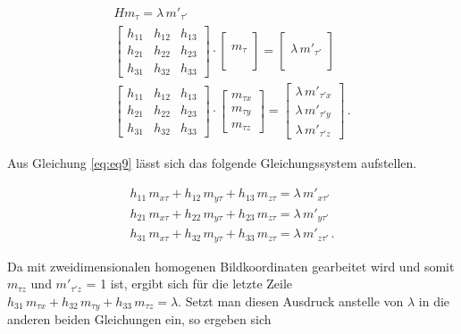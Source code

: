 \begin{gather}
	 H m_\tau = \lambda \,m'_{\tau'}\\
	\begin{bmatrix}
		h_{11}&h_{12}&h_{13}\\
		h_{21}&h_{22}&h_{23}\\
		h_{31}&h_{32}&h_{33}
	\end{bmatrix}
	\cdot
	\begin{bmatrix}
		\\m_\tau\\\\
	\end{bmatrix}
	=
	\begin{bmatrix}
		\\\lambda\, m'_{\tau'}\\\\
	\end{bmatrix}\\
	\begin{bmatrix}
		h_{11}&h_{12}&h_{13}\\
		h_{21}&h_{22}&h_{23}\\
		h_{31}&h_{32}&h_{33}
	\end{bmatrix}
	\cdot
	\begin{bmatrix}
		m_{\tau x}\\m_{\tau y}\\m_{\tau z}
	\end{bmatrix}
	=
	\begin{bmatrix}
		\lambda\, m'_{\tau' x}\\\lambda\, m'_{\tau' y}\\\lambda \,m'_{\tau' z}\label{eq:eq9}
	\end{bmatrix} \, .
\end{gather}

Aus Gleichung \ref{eq:eq9} lässt sich das folgende Gleichungssystem aufstellen.  

\begin{gather}
	h_{11}\,m_{x \tau}+h_{12}\,m_{y \tau}+h_{13}\,m_{z \tau}= \lambda \,m'_{x\tau'}\\
	h_{21}\,m_{x\tau}+h_{22}\,m_{y\tau}+h_{23}\,m_{z\tau}= \lambda\, m'_{y\tau'}\\
	h_{31}\,m_{x\tau}+h_{32}\,m_{y\tau}+h_{33}\,m_{z\tau}= \lambda \,m'_{z\tau'} \, .
\end{gather}

Da mit zweidimensionalen homogenen Bildkoordinaten gearbeitet wird und somit $m_{\tau z}$ und $m'_{\tau' z}$ = 1 ist, ergibt sich für die letzte Zeile $h_{31}\,m_{\tau x}+h_{32}\,m_{\tau y}+h_{33}\,m_{\tau z}= \lambda$. Setzt man diesen Ausdruck anstelle von $\lambda$ in die anderen beiden Gleichungen ein, so ergeben sich

